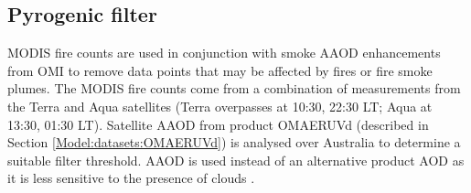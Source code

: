   
  
  
  \subsection{Pyrogenic filter}
    \label{Model:filter:fire}
    
    MODIS fire counts are used in conjunction with smoke AAOD enhancements from OMI to remove data points that may be affected by fires or fire smoke plumes.
    The MODIS fire counts come from a combination of measurements from the Terra and Aqua satellites (Terra overpasses at 10:30, 22:30 LT; Aqua at 13:30, 01:30 LT).
    Satellite AAOD from product OMAERUVd (described in Section \ref{Model:datasets:OMAERUVd}) is analysed over Australia to determine a suitable filter threshold.
    AAOD is used instead of an alternative product AOD as it is less sensitive to the presence of clouds \parencite{Ahn2008}.
    
